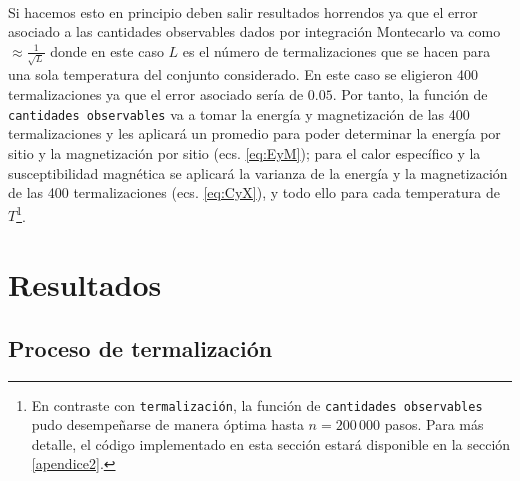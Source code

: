 \documentclass[11pt,a4paper]{article}
\begin{document}
\\
Si hacemos esto en principio deben salir resultados horrendos ya que el error asociado a las cantidades observables dados por integración Montecarlo va como $\approx\frac{1}{\sqrt{L}}$ donde en este caso $L$ es el número de termalizaciones que se hacen para una sola temperatura del conjunto considerado. En este caso se eligieron 400 termalizaciones ya que el error asociado sería de $0.05$. Por tanto, la función de \texttt{cantidades observables} va a tomar la energía y magnetización de las 400 termalizaciones y les aplicará un promedio para poder determinar la energía por sitio y la magnetización por sitio (ecs. \ref{eq:EyM}); para el calor específico y la susceptibilidad magnética se aplicará la varianza de la energía y la magnetización de las 400 termalizaciones (ecs. \ref{eq:CyX}), y todo ello para cada temperatura de $T$\footnote{En contraste con \texttt{termalización}, la función de \texttt{cantidades observables} pudo desempeñarse de manera óptima hasta $n=200\, 000$ pasos. Para más detalle, el código implementado en esta sección estará disponible en la sección \ref{apendice2}.}.


\section{Resultados}

\subsection{Proceso de termalización}
\end{document}
